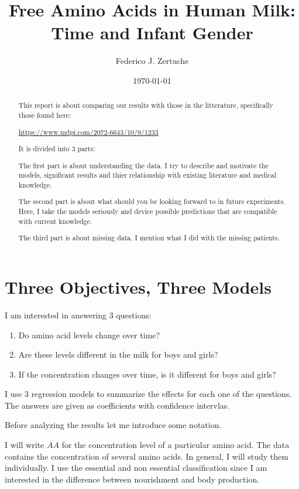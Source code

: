 \documentclass[12pt]{article}
\title{Free Amino Acids in Human Milk: Time and Infant Gender}
\author{Federico J. Zertuche}
\date{\today}
\begin{document}
\maketitle

\begin{abstract}
This report is about comparing our results with those in the litterature, specifically those found here:

\begin{center}
  \href{https://www.mdpi.com/2072-6643/10/9/1233}{https://www.mdpi.com/2072-6643/10/9/1233}
\end{center}

It is divided into $3$ parts:

The first part is about understanding the data. I try to describe and motivate the models, significant results and thier relationship with existing literature and medical knowledge.

The second part is about what should you be looking forward to in future experiments. Here, I take the models seriously and device possible predictions that are compatible with current knowledge.

The third part is about missing data. I mention what I did with the missing patients.

\end{abstract}

\part{Three Objectives, Three Models}

I am interested in answering $3$ questions:

\begin{enumerate}
  \item Do amino acid levels change over time?
  \item Are these levels different in the milk for boys and girls?
  \item If the concentration changes over time, is it different for boys and girls?
\end{enumerate}

I use $3$ regression models to summarize the effects for each one of the questions. The answers are given as coefficients with confidence intervlas.

Before analyzing the results let me introduce some notation.

I will write $AA$ for the concentration level of a particular amino acid. The data contains the concentration of several amino acids. In general, I will study them individually. I use the essential and non essential classification since I am interested in the difference between nourishment and body production.
\end{document}
